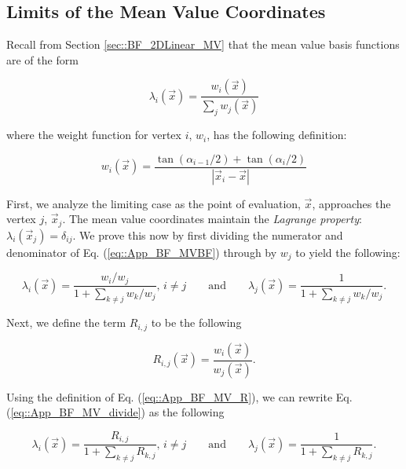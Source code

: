 \subsection{Limits of the Mean Value Coordinates}
\label{sec::appendix_BF_Limits_MV}

Recall from Section \ref{sec::BF_2DLinear_MV} that the mean value basis functions are of the form

\begin{equation}
\label{eq::App_BF_MVBF}
\lambda_i (\vec{x}) = \frac{w_i  (\vec{x}) }{\sum_j w_j  (\vec{x}) }
\end{equation}

\noindent where the weight function for vertex $i$, $w_i$, has the following definition:

\begin{equation}
\label{eq::App_BF_MV_weights}
w_i (\vec{x})  = \frac{\tan(\alpha_{i-1} / 2) + \tan(\alpha_i / 2)}{|\vec{x}_i - \vec{x}|}
\end{equation}

First, we analyze the limiting case as the point of evaluation, $\vec{x}$, approaches the vertex $j$, $\vec{x}_j$. The mean value coordinates maintain the {\em Lagrange property}: $\lambda_i (\vec{x}_j)=\delta_{ij}$. We prove this now by first dividing the numerator and denominator of Eq. (\ref{eq::App_BF_MVBF}) through by $w_j$ to yield the following:

\begin{equation}
\label{eq::App_BF_MV_divide}
\lambda_i (\vec{x}) = \frac{w_i/w_j}{1+\sum_{k\neq j} w_k/w_j}, \, i \neq j \qquad \text{and} \qquad \lambda_j (\vec{x}) = \frac{1}{1+\sum_{k\neq j} w_k/w_j} .
\end{equation}

\noindent Next, we define the term $R_{i,j}$ to be the following

\begin{equation}
\label{eq::App_BF_MV_R}
R_{i,j}(\vec{x}) = \frac{w_i (\vec{x})}{w_j (\vec{x})} .
\end{equation}

\noindent Using the definition of Eq. (\ref{eq::App_BF_MV_R}), we can rewrite Eq. (\ref{eq::App_BF_MV_divide}) as the following 

\begin{equation}
\label{eq::App_BF_MV_divideR}
\lambda_i (\vec{x}) = \frac{R_{i,j}}{1+\sum_{k\neq j} R_{k,j}}, \, i \neq j \qquad \text{and} \qquad \lambda_j (\vec{x}) = \frac{1}{1+\sum_{k\neq j} R_{k,j}} .
\end{equation}

